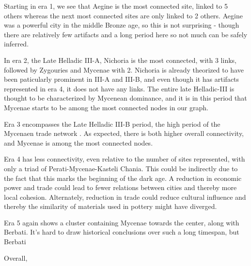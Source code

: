 Starting in era 1, we see that Aegine is the most connected site, linked to 5 others whereas the next most connected sites are only linked to 2 others. Aegine was a powerful city in the middle Bronze age, so this is not surprising - though there are relatively few artifacts and a long period here so not much can be safely inferred. 

In era 2, the Late Helladic III-A, Nichoria is the most connected, with 3 links, followed by Zygouries and Mycenae with 2.  Nichoria is already theorized to have been paticularly prominent in III-A and III-B\cite{shelmerdine1981nichoria}, and even though it has artifacts represented in era 4, it does not have any links. The entire late Helladic-III is thought to be characterized by Mycenean dominance\cite{demand2011mediterranean}, and it is in this period that Mycenae starts to be among the most connected nodes in our graph. 

Era 3 encompasses the Late Helladic III-B period, the high period of the Mycenaen trade network \cite{demand2011mediterranean}. As expected, there is both higher overall connectivity, and Mycenae is among the most connected nodes.

Era 4 has less connectivity, even relative to the number of sites represented, with only a triad of Perati-Mycenae-Kasteli Chania. This could be indirectly due to the fact that this marks the beginning of the dark age. A reduction in economic power and trade could lead to fewer relations between cities and thereby more local cohesion. Alternately, reduction in trade could reduce cultural influence and thereby the similarity of materials used in pottery might have diverged. 

Era 5 again shows a cluster containing Mycenae towards the center, along with Berbati. It's hard to draw historical conclusions over such a long timespan, but Berbati 

Overall, 

 
  




